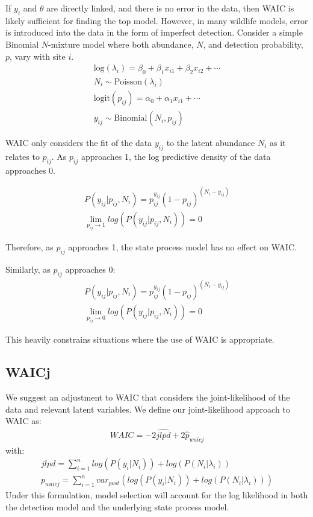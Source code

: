 \documentclass[12pt]{article}
\begin{document}
 If $y_i$ and $\theta$ are directly linked, and there is no error in the data, then WAIC is likely sufficient for finding the top model. However, in many wildlife models, error is introduced into the data in the form of imperfect detection. Consider a simple Binomial $N$-mixture model where both abundance, $N$, and detection probability, $p$, vary with site $i$. 
 \begin{gather*}
    \mathrm{log}(\lambda_i) = \beta_0 + \beta_1  x_{i1} +
    \beta_2 x_{i2} + \cdots \\
    N_i \sim \mathrm{Poisson}(\lambda_i)\\
    \mathrm{logit}(p_{ij}) = \alpha_0 + \alpha_1 x_{i1} + \cdots \\
    y_{ij} \sim \mathrm{Binomial}(N_i, p_{ij})
  \end{gather*}
  
WAIC only considers the fit of the data $y_{ij}$ to the latent abundance $N_i$ as it relates to $p_{ij}$. As $p_{ij}$ approaches 1, the log predictive density of the data approaches 0. 


 \begin{gather*}
 P(y_{ij}| p_{ij}, N_{i}) = p_{ij}^{y_{ij}}(1-p_{ij})^{(N_i-y_{ij})} \\
\lim_{p_{ij} \to 1} log(P(y_{ij}| p_{ij}, N_{i})) = 0
 \end{gather*}
 
Therefore, as $p_{ij}$ approaches 1, the state process model has no effect on WAIC. 

Similarly, as $p_{ij}$ approaches 0:
 \begin{gather*}
 P(y_{ij}| p_{ij}, N_{i}) = p_{ij}^{y_{ij}}(1-p_{ij})^{(N_i-y_{ij})} \\
 \lim_{p_{ij} \to 0} log(P(y_{ij}| p_{ij}, N_{i})) = 0
 \end{gather*}


This heavily constrains situations where the use of WAIC is appropriate. 

 
\subsection{WAICj}
We suggest an adjustment to WAIC that considers the joint-likelihood of the data and relevant latent variables. We define our joint-likelihood approach to WAIC as:
\begin{gather*}
 WAIC = -2\widehat{jlpd} + 2\widehat{p}_{waicj}
 \end{gather*}
 with:
   \begin{gather*}
  jlpd = \sum_{i = 1}^{n} log(P(y_i | N_i)) + log(P(N_i | \lambda_i)) \\
  p_{waicj} = \sum_{i = 1}^{n} var_{post}(log(P(y_i | N_i)) + log(P(N_i | \lambda_i)))
  \end{gather*} 
Under this formulation, model selection will account for the log likelihood in both the detection model and the underlying state process model. 
\end{document}
